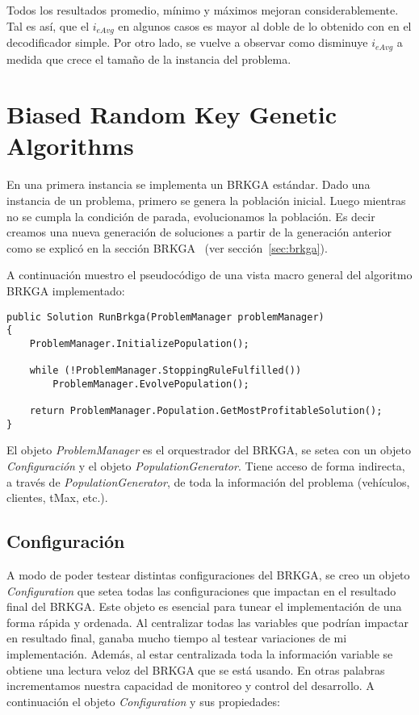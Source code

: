 Todos los resultados promedio, mínimo y máximos mejoran considerablemente. Tal es así, que el $i_{eAvg}$ en algunos casos es mayor al doble de lo obtenido con en el decodificador simple. Por otro lado, se vuelve a observar como disminuye $i_{eAvg}$ a medida que crece el tamaño de la instancia del problema.

\section{Biased Random Key Genetic Algorithms}

En una primera instancia se implementa un BRKGA estándar. Dado una instancia de un problema, primero se genera la población inicial. Luego mientras no se cumpla la condición de parada, evolucionamos la población. Es decir creamos una nueva generación de soluciones a partir de la generación anterior como se explicó en la sección BRKGA ~(ver sección~\ref{sec:brkga}).

\bigskip

A continuación muestro el pseudocódigo de una vista macro general del algoritmo BRKGA implementado:

\bigskip

\begin{minipage}{\textwidth}
\begin{lstlisting} 
public Solution RunBrkga(ProblemManager problemManager)
{
    ProblemManager.InitializePopulation();

    while (!ProblemManager.StoppingRuleFulfilled())
        ProblemManager.EvolvePopulation();

    return ProblemManager.Population.GetMostProfitableSolution();
}
\end{lstlisting}
\end{minipage}

\bigskip

El objeto \textit{ProblemManager} es el orquestrador del BRKGA, se setea con un objeto \textit{Configuración} y el objeto \textit{PopulationGenerator}. Tiene acceso de forma indirecta, a través de \textit{PopulationGenerator}, de toda la información del problema (vehículos, clientes, tMax, etc.).

\subsection{Configuración}

A modo de poder testear distintas configuraciones del BRKGA, se creo un objeto \textit{Configuration} que setea todas las configuraciones que impactan en el resultado final del BRKGA. Este objeto es esencial para tunear el implementación de una forma rápida y ordenada. Al centralizar todas las variables que podrían impactar en resultado final, ganaba mucho tiempo al testear variaciones de mi implementación. Además, al estar centralizada toda la información variable se obtiene una lectura veloz del BRKGA que se está usando. En otras palabras incrementamos nuestra capacidad de monitoreo y control del desarrollo. A continuación el objeto \textit{Configuration} y sus propiedades:


